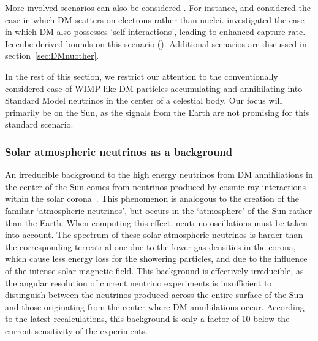 \medskip


More involved scenarios can also be considered \cite{NSDMnu}. For instance,  and  considered the case in which DM scatters on electrons rather than nuclei.  investigated the case in which DM also possesses `self-interactions', leading to enhanced capture rate. {\sc Icecube} derived bounds on this scenario (). 
Additional scenarios are discussed in section~\ref{sec:DMnuother}.

In the rest of this section, 
we restrict our attention to the conventionally considered case of WIMP-like DM particles accumulating and annihilating into Standard Model neutrinos in the center of a celestial body.
Our focus will primarily be on the Sun, as the signals from the Earth are not promising for this standard scenario.


\medskip

 \subsubsection{Solar atmospheric neutrinos as a background}

An irreducible background to the high energy neutrinos from DM annihilations in the center of the Sun comes from neutrinos produced by cosmic ray interactions within the solar corona~\cite{SAnu}.
This phenomenon is analogous to the creation of the familiar `atmospheric neutrinos', but occurs in the `atmosphere' of the Sun rather than the Earth.
  When computing this effect, neutrino oscillations must be taken into account. The spectrum of these solar atmospheric neutrinos is harder than the corresponding terrestrial one due to the lower gas densities in the corona, which cause less energy loss for the showering particles, and due to the influence of the intense solar magnetic field.
This background is effectively irreducible, as the angular resolution of current neutrino experiments is insufficient to distinguish between the neutrinos produced across the entire surface of the Sun and those originating from the center where DM annihilations occur.
According to the latest recalculations, this background is only a factor of 10 below the current sensitivity of the experiments. 



